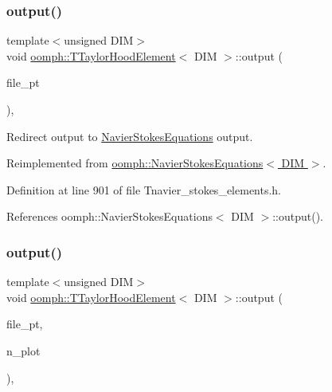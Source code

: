 \subsubsection{\texorpdfstring{output()}{output()}\hspace{0.1cm}{\footnotesize\ttfamily [3/4]}}
{\footnotesize\ttfamily template$<$unsigned D\+IM$>$ \\
void \hyperlink{classoomph_1_1TTaylorHoodElement}{oomph\+::\+T\+Taylor\+Hood\+Element}$<$ D\+IM $>$\+::output (\begin{DoxyParamCaption}\item[{F\+I\+LE $\ast$}]{file\+\_\+pt }\end{DoxyParamCaption})\hspace{0.3cm}{\ttfamily [inline]}, {\ttfamily [virtual]}}



Redirect output to \hyperlink{classoomph_1_1NavierStokesEquations}{Navier\+Stokes\+Equations} output. 



Reimplemented from \hyperlink{classoomph_1_1NavierStokesEquations_acb921a406e5825d9b17ed41c40317e4a}{oomph\+::\+Navier\+Stokes\+Equations$<$ D\+I\+M $>$}.



Definition at line 901 of file Tnavier\+\_\+stokes\+\_\+elements.\+h.



References oomph\+::\+Navier\+Stokes\+Equations$<$ D\+I\+M $>$\+::output().

\mbox{\label{classoomph_1_1TTaylorHoodElement_ab7aa0a74ee8fd566b95d3681f2240c62}} 
\subsubsection{\texorpdfstring{output()}{output()}\hspace{0.1cm}{\footnotesize\ttfamily [4/4]}}
{\footnotesize\ttfamily template$<$unsigned D\+IM$>$ \\
void \hyperlink{classoomph_1_1TTaylorHoodElement}{oomph\+::\+T\+Taylor\+Hood\+Element}$<$ D\+IM $>$\+::output (\begin{DoxyParamCaption}\item[{F\+I\+LE $\ast$}]{file\+\_\+pt,  }\item[{const unsigned \&}]{n\+\_\+plot }\end{DoxyParamCaption})\hspace{0.3cm}{\ttfamily [inline]}, {\ttfamily [virtual]}}



